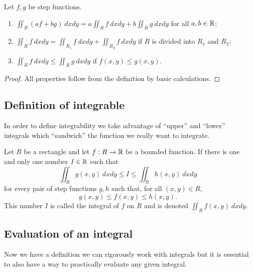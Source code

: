 \begin{theorem}
    Let \(f,g\) be step functions.
    \begin{enumerate}
        \item \(\displaystyle \iint_{R} (a f + b g) \ dxdy = a \displaystyle \iint_{R} f \ dxdy + b \displaystyle\iint_{R} g \ dxdy\) for all \(a,b\in \mathbb{R}\);
        \item \(\displaystyle\iint_{R} f \ dxdy =  \displaystyle\iint_{R_1} f \ dxdy + \displaystyle \iint_{R_2} f \ dxdy\) if \(R\) is divided into \(R_1\) and \(R_2\);
        \item \(\displaystyle\iint_{R} f \ dxdy \leq \displaystyle \iint_{R} g \ dxdy\) if \(f(x,y) \leq g(x,y)\).
    \end{enumerate}
\end{theorem}

\begin{proof}
    All properties follow from the definition by basic calculations.
\end{proof}



\subsection{Definition of integrable}


In order to define integrability we take advantage of ``upper'' and ``lower'' integrals which ``sandwich'' the function we really want to integrate.

\begin{definition}[integrability]
    Let \(R\) be a rectangle and let \(f: R \to \mathbb{R}\) be a bounded function.
    If there is one and only one number \(I\in \mathbb{R}\) such that
    \[
        \iint_{R} g(x,y) \ dxdy \leq I \leq \iint_{R} h(x,y) \ dxdy
    \]
    for every pair of step functions \( g, h\) such that, for all \((x,y)\in R\),
    \[
        g(x,y) \leq f(x,y) \leq h(x,y).
    \]
    This number \(I\) is called the integral of \(f\) on \(R\) and is denoted \(\iint_{R} f(x,y) \ dxdy\).
\end{definition}


\subsection{Evaluation of an integral}

Now we have a definition we can rigorously work with integrals but it is essential to also have a way to practically evaluate any given integral.

